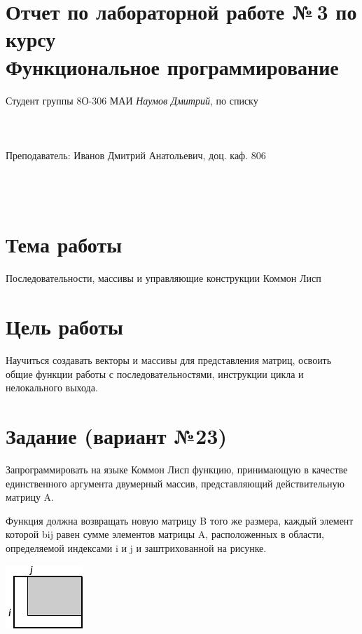 \documentclass[12pt]{article}
\begin{document}
\section*{Отчет по лабораторной работе №\,3 
по курсу \\
\guillemotleft Функциональное программирование\guillemotright}
\begin{flushright}
Студент группы 8О-306 МАИ \textit{Наумов Дмитрий},  по списку \\
 \\
 \\
\ \\
Преподаватель: Иванов Дмитрий Анатольевич, доц. каф. 806 \\
 \\
 \\
 \\

\end{flushright}

\section{Тема работы}
Последовательности, массивы и управляющие конструкции Коммон Лисп
\section{Цель работы}
Научиться создавать векторы и массивы для представления матриц, освоить общие функции работы с последовательностями, инструкции цикла и нелокального выхода.
\section{Задание (вариант №23)}
Запрограммировать на языке Коммон Лисп функцию, принимающую в качестве единственного аргумента двумерный массив, представляющий действительную матрицу A.

Функция должна возвращать новую матрицу B того же размера, каждый элемент которой bij равен сумме элементов матрицы A, расположенных в области, определяемой индексами i и j и заштрихованной на рисунке.

\begin{center}
    \includegraphics[scale=0.65]{arrays_matrix-ij-tr}
\end{center}
\end{document}
